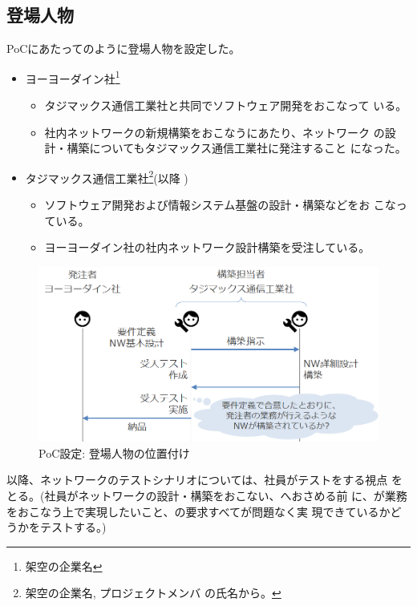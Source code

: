  \subsection{登場人物}
  \label{sec:poc-casting}

PoCにあたってのように登場人物を設定した。
\begin{itemize}
 \item ヨーヨーダイン社\footnote{架空の企業名\cite{yoyodyne}}
       \begin{itemize}
        \item タジマックス通信工業社と共同でソフトウェア開発をおこなって
              いる。
        \item 社内ネットワークの新規構築をおこなうにあたり、ネットワーク
              の設計・構築についてもタジマックス通信工業社に発注すること
              になった。
       \end{itemize}
 \item タジマックス通信工業社\footnote{架空の企業名, プロジェクトメンバ
       の氏名から。}(以降 \tj )
       \begin{itemize}
        \item ソフトウェア開発および情報システム基盤の設計・構築などをお
              こなっている。
        \item ヨーヨーダイン社の社内ネットワーク設計構築を受注している。
       \end{itemize}
\end{itemize}

\begin{figure}[h]
 \centering
 \includegraphics[scale=0.5]{img/poc-situation.png}
 \caption{PoC設定: 登場人物の位置付け}
 \label{fig:poc-situation}
\end{figure}

以降、ネットワークのテストシナリオについては、\tj 社員がテストをする視点
をとる。(\tj 社員がネットワークの設計・構築をおこない、\yo へおさめる前
に、\yo が業務をおこなう上で実現したいこと、\yo の要求すべてが問題なく実
現できているかどうかをテストする。)

